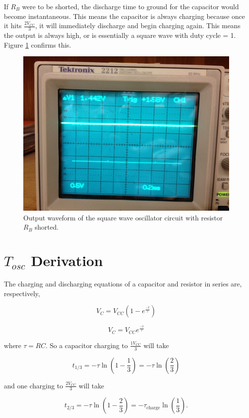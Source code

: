 \documentclass[12pt,letterpaper]{report}
\newlength \figwidth
\begin{document}
If $R_B$ were to be shorted, the discharge time to ground for the capacitor would become instantaneous. This means the capacitor is always charging because once it hits $\frac{2V_{CC}}{3}$, it will immediately discharge and begin charging again. This means the output is always high, or is essentially a square wave with duty cycle = 1. Figure \ref{fig:short} confirms this. 

\begin{figure}[H]
\centering
\includegraphics[width=\figwidth, keepaspectratio=true]{lab8_images/shorted.jpg}
\caption{Output waveform of the square wave oscillator circuit with resistor $R_B$ shorted.}
\label{fig:short}
\end{figure}

\section*{$T_{osc}$ Derivation}
The charging and discharging equations of a capacitor and resistor in series are, respectively,

$$
V_C = V_{CC}(1-e^{\frac{-t}{\tau}})
$$

$$
V_C = V_{CC}e^{\frac{-t}{\tau}}
$$

where $\tau = RC$. So a capacitor charging to $\frac{1V_{CC}}{3}$ will take

$$
t_{1/3} = -\tau \ln (1 - \frac{1}{3}) = -\tau \ln (\frac{2}{3})
$$

and one charging to $\frac{2V_{CC}}{3}$ will take

$$
t_{2/3} = -\tau \ln (1 - \frac{2}{3}) = -\tau_{\text{charge}} \ln (\frac{1}{3}).
$$
\end{document}
